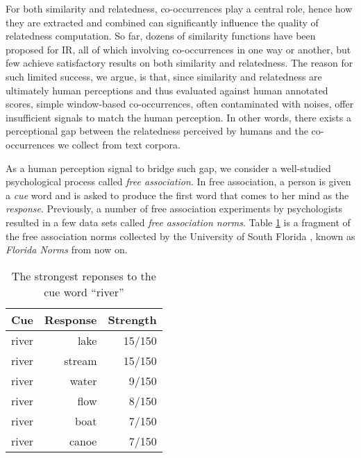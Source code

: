 \documentclass[letterpaper]{article}
\newcommand{\tabref}[1]{Table \ref{#1}}
\begin{document}
For both similarity and relatedness, co-occurrences play a central
role, hence how they are extracted and combined can significantly
influence the quality of relatedness computation. 
So far, dozens of similarity functions
\cite{mcgill1979evaluation} 
have been proposed for IR, all of which involving co-occurrences in
one way or another, but few achieve satisfactory results on both
similarity and relatedness. The reason for such limited success, we
argue, is that, since similarity and relatedness are ultimately
human perceptions and thus evaluated against human annotated scores,
simple window-based co-occurrences, often contaminated with noises, offer insufficient signals to
match the human perception. In other words, there exists a
perceptional gap between the relatedness perceived by humans and the
co-occurrences we collect from text corpora.

As a human perception signal to bridge such gap, we consider a
well-studied psychological process called {\em free association}. In
free association, a person is given a {\em cue} word and is asked to
produce the first word that comes to her mind as the {\em response}. Previously, a number
of free association experiments by psychologists
resulted in a few data sets called {\em free association norms}.
\tabref{tab:florida} is a fragment of the free association norms collected by the
University of South Florida \cite{Nelson:2004}, known as {\em Florida Norms} from now on.

\begin{table}[ht]
\begin{center}
\caption{The strongest reponses to the cue word ``river''}
\begin{tabular}{lrr}\hline
Cue &   Response    &Strength \\\hline
river&    lake&       15/150 \\
river&    stream&      15/150\\
river&    water&      9/150\\
river&    flow&    8/150\\
river&    boat&       7/150\\
river&    canoe&        7/150\\
\hline
\end{tabular}
\end{center}
\label{tab:florida}
\end{table}
\end{document}
